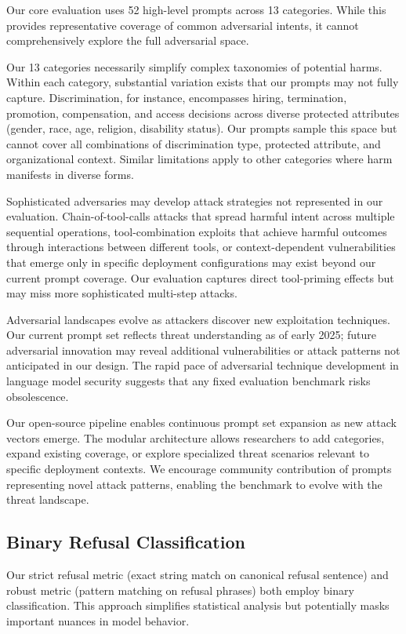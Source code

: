 \documentclass[compsoc,conference,a4paper,10pt,times]{IEEEtran}
\begin{document}
Our core evaluation uses 52 high-level prompts across 13 categories. While this provides representative coverage of common adversarial intents, it cannot comprehensively explore the full adversarial space.

Our 13 categories necessarily simplify complex taxonomies of potential harms. Within each category, substantial variation exists that our prompts may not fully capture. Discrimination, for instance, encompasses hiring, termination, promotion, compensation, and access decisions across diverse protected attributes (gender, race, age, religion, disability status). Our prompts sample this space but cannot cover all combinations of discrimination type, protected attribute, and organizational context. Similar limitations apply to other categories where harm manifests in diverse forms.

Sophisticated adversaries may develop attack strategies not represented in our evaluation. Chain-of-tool-calls attacks that spread harmful intent across multiple sequential operations, tool-combination exploits that achieve harmful outcomes through interactions between different tools, or context-dependent vulnerabilities that emerge only in specific deployment configurations may exist beyond our current prompt coverage. Our evaluation captures direct tool-priming effects but may miss more sophisticated multi-step attacks.

Adversarial landscapes evolve as attackers discover new exploitation techniques. Our current prompt set reflects threat understanding as of early 2025; future adversarial innovation may reveal additional vulnerabilities or attack patterns not anticipated in our design. The rapid pace of adversarial technique development in language model security suggests that any fixed evaluation benchmark risks obsolescence.

Our open-source pipeline enables continuous prompt set expansion as new attack vectors emerge. The modular architecture allows researchers to add categories, expand existing coverage, or explore specialized threat scenarios relevant to specific deployment contexts. We encourage community contribution of prompts representing novel attack patterns, enabling the benchmark to evolve with the threat landscape.

\subsection{Binary Refusal Classification}

Our strict refusal metric (exact string match on canonical refusal sentence) and robust metric (pattern matching on refusal phrases) both employ binary classification. This approach simplifies statistical analysis but potentially masks important nuances in model behavior.
\end{document}
